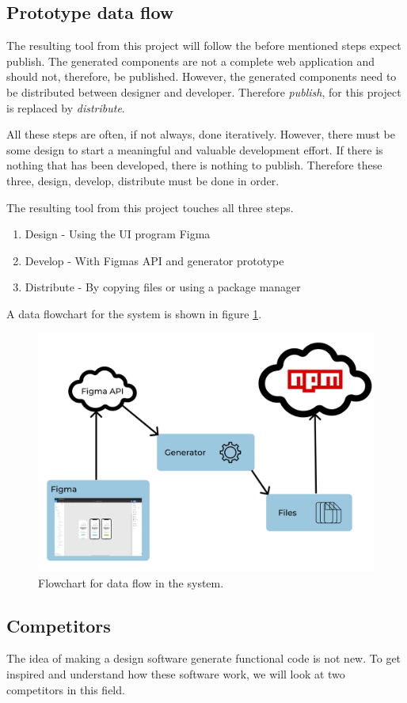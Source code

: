 \subsection{Prototype data flow}%
\label{sub:Prototype data flow}
The resulting tool from this project will follow the before mentioned steps expect publish. The generated \glspl{component} are not a complete web application and should not, therefore, be published. However, the generated \glspl{component} need to be distributed between designer and developer. Therefore \textit{publish}, for this project is replaced by \textit{distribute}. 

All these steps are often, if not always, done iteratively. However, there must be some design to start a meaningful and valuable development effort. If there is nothing that has been developed, there is nothing to publish. Therefore these three, design, develop, distribute must be done in order. 

The resulting tool from this project touches all three steps. 
\begin{enumerate}
  \item Design - Using the UI program Figma
  \item Develop - With Figmas API and generator prototype
  \item Distribute - By copying files or using a package manager 
\end{enumerate}
A data flowchart for the system is shown in figure \ref{fig:flow}.

\begin{figure}[H]
  \centering
  \includegraphics[width=0.8\linewidth]{images/flow2.png}
  \caption{Flowchart for data flow in the system.}%
  \label{fig:flow}
\end{figure}


\subsection{Competitors}%
\label{sub:Competitors}
The idea of making a design software generate functional code is not new. To get inspired and understand how these software work, we will look at two competitors in this field. 

